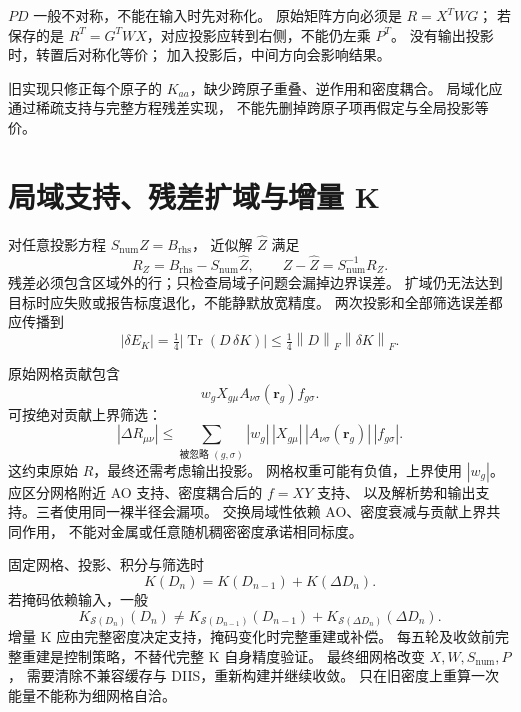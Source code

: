\documentclass[UTF8,fontset=fandol,11pt,a4paper]{ctexart}
\numberwithin{equation}{section}
\newcommand{\Tr}{\operatorname{Tr}}
\newcommand{\norm}[1]{\left\lVert #1\right\rVert}
\begin{document}
\(PD\) 一般不对称，不能在输入时先对称化。
原始矩阵方向必须是 \(R=X^TWG\)；
若保存的是 \(R^T=G^TWX\)，对应投影应转到右侧，不能仍左乘 \(P^T\)。
没有输出投影时，转置后对称化等价；
加入投影后，中间方向会影响结果。

旧实现只修正每个原子的 \(K_{aa}\)，缺少跨原子重叠、逆作用和密度耦合。
局域化应通过稀疏支持与完整方程残差实现，
不能先删掉跨原子项再假定与全局投影等价。

\section{局域支持、残差扩域与增量 K}
\label{sec:screen}
对任意投影方程 \(S_{\mathrm{num}}Z=B_{\mathrm{rhs}}\)，
近似解 \(\widehat Z\) 满足
\begin{equation}
R_Z=B_{\mathrm{rhs}}-S_{\mathrm{num}}\widehat Z,\qquad
Z-\widehat Z=S_{\mathrm{num}}^{-1}R_Z.
\end{equation}
残差必须包含区域外的行；只检查局域子问题会漏掉边界误差。
扩域仍无法达到目标时应失败或报告标度退化，不能静默放宽精度。
两次投影和全部筛选误差都应传播到
\begin{equation}
|\delta E_K|=\tfrac14|\Tr(D\,\delta K)|
\leq\tfrac14\norm{D}_F\norm{\delta K}_F.
\end{equation}

原始网格贡献包含
\begin{equation}
w_gX_{g\mu}A_{\nu\sigma}(\bm r_g)f_{g\sigma}.
\end{equation}
可按绝对贡献上界筛选：
\begin{equation}
|\Delta R_{\mu\nu}|
\leq\sum_{\text{被忽略 }(g,\sigma)}
|w_g|\,|X_{g\mu}|\,|A_{\nu\sigma}(\bm r_g)|\,|f_{g\sigma}|.
\end{equation}
这约束原始 \(R\)，最终还需考虑输出投影。
网格权重可能有负值，上界使用 \(|w_g|\)。
应区分网格附近 AO 支持、密度耦合后的 \(f=XY\) 支持、
以及解析势和输出支持。三者使用同一裸半径会漏项。
交换局域性依赖 AO、密度衰减与贡献上界共同作用，
不能对金属或任意随机稠密密度承诺相同标度。

固定网格、投影、积分与筛选时
\begin{equation}
K(D_n)=K(D_{n-1})+K(\Delta D_n).
\end{equation}
若掩码依赖输入，一般
\begin{equation}
K_{\mathcal S(D_n)}(D_n)\ne
K_{\mathcal S(D_{n-1})}(D_{n-1})
+K_{\mathcal S(\Delta D_n)}(\Delta D_n).
\end{equation}
增量 K 应由完整密度决定支持，掩码变化时完整重建或补偿。
每五轮及收敛前完整重建是控制策略，不替代完整 K 自身精度验证。
最终细网格改变 \(X,W,S_{\mathrm{num}},P\)，
需要清除不兼容缓存与 DIIS，重新构建并继续收敛。
只在旧密度上重算一次能量不能称为细网格自洽。
\end{document}
